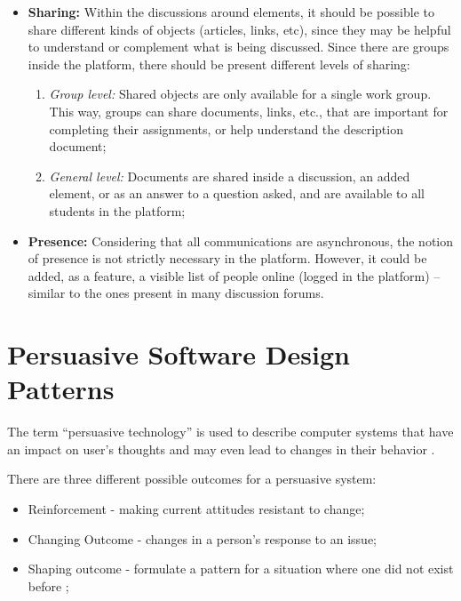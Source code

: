 \begin{itemize}
\item \textbf{Sharing:} Within the discussions around elements, it should be possible to share different kinds of objects (articles, links, etc), since they may be helpful to understand or complement what is being discussed. Since there are groups inside the platform, there should be present different levels of sharing:

\begin{enumerate}
\item \textit{Group level:} Shared objects are only available for a single work group. 
This way, groups can share documents, links, etc., that are important for completing their assignments, or help understand the description document;

\item \textit{General level:} Documents are shared inside a discussion, an added element, or as an answer to a question asked, and are available to all students in the platform;
\end{enumerate}


\item \textbf{Presence:} Considering that all communications are asynchronous, the notion of presence is not strictly necessary in the platform. 
However, it could be added, as a feature, a visible list of people online (logged in the platform) – similar to the ones present in many discussion forums.
\end{itemize}

\section{Persuasive Software Design Patterns}
\label{section:relatedWorkPersuasive}
The term ``persuasive technology'' is used to describe computer systems that have an impact on user's thoughts and may even lead to changes in their behavior \cite{fogg2002persuasive,oinas2009persuasive}.

There are three different possible outcomes for a persuasive system:

\begin{itemize}
\item Reinforcement - making current attitudes resistant to change;
\item Changing Outcome - changes in a person's response to an issue;
\item Shaping outcome - formulate a pattern for a situation where one did not exist before \cite{oinas2008towards};
\end{itemize}

